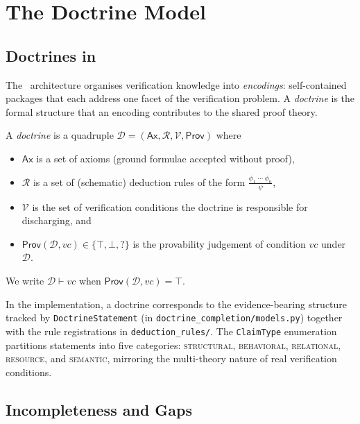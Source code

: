 \documentclass[11pt]{article}
\newcommand{\Doct}{\mathcal{D}}           %
\newcommand{\Ax}{\mathsf{Ax}}             %
\newcommand{\Rules}{\mathcal{R}}          %
\newcommand{\Prov}{\mathsf{Prov}}         %
\newcommand{\VC}{\mathit{vc}}             %
\newcommand{\VCset}{\mathcal{V}}          %
\begin{document}
\section{The Doctrine Model}\label{sec:doctrine}

\subsection{Doctrines in \JuGeo}

The \JuGeo\ architecture organises verification knowledge into
\emph{encodings}: self-contained packages that each address one facet
of the verification problem.  A \emph{doctrine} is the formal structure
that an encoding contributes to the shared proof theory.

\begin{definition}[Doctrine]\label{def:doctrine}
A \emph{doctrine} is a quadruple
$\Doct = (\Ax, \Rules, \VCset, \Prov)$ where
\begin{itemize}[leftmargin=2em]
  \item $\Ax$ is a set of axioms (ground formulae accepted without proof),
  \item $\Rules$ is a set of (schematic) deduction rules of the form
        $\frac{\phi_1 \;\cdots\; \phi_n}{\psi}$,
  \item $\VCset$ is the set of verification conditions the doctrine is
        responsible for discharging, and
  \item $\Prov(\Doct, \VC) \in \{\top, \bot, \mathord{?}\}$ is the
        provability judgement of condition $\VC$ under~$\Doct$.
\end{itemize}
We write $\Doct \vdash \VC$ when $\Prov(\Doct, \VC) = \top$.
\end{definition}

In the implementation, a doctrine corresponds to the evidence-bearing
structure tracked by \texttt{DoctrineStatement} (in
\texttt{doctrine\_completion/models.py}) together with the rule
registrations in \texttt{deduction\_rules/}.  The
\texttt{ClaimType} enumeration partitions statements into five
categories: \textsc{structural}, \textsc{behavioral},
\textsc{relational}, \textsc{resource}, and \textsc{semantic},
mirroring the multi-theory nature of real verification conditions.

\subsection{Incompleteness and Gaps}
\end{document}
